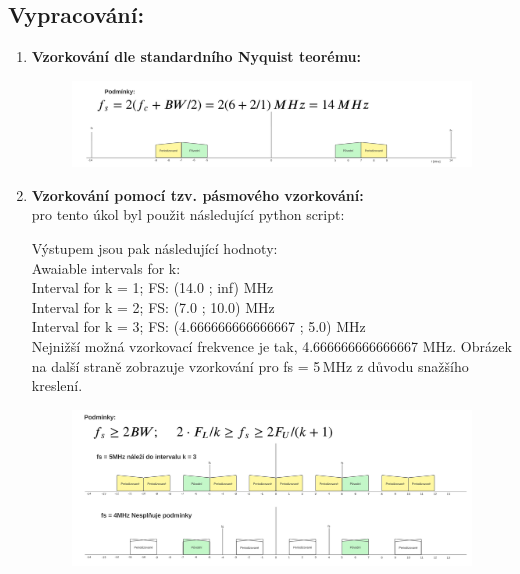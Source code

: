 \documentclass[10pt, a4paper]{article}%
\begin{document}
        \subsection*{Vypracování:}
        \begin{enumerate}

            \item	\textbf{Vzorkování dle standardního Nyquist teorému:}
            \begin{figure}[ht!]
                \centering
                \includegraphics[width = \textwidth]{pict/NQST.png}
            \end{figure}            
            \item	\textbf{Vzorkování pomocí tzv. pásmového vzorkování:}\\
            pro tento úkol byl použit následující python script:
            

            Výstupem jsou pak následující hodnoty:\\
            Awaiable intervals for k:\\
            Interval for k = 1; FS: (14.0 ; inf) MHz\\
            Interval for k = 2; FS: (7.0 ; 10.0) MHz\\
            Interval for k = 3; FS: (4.666666666666667 ; 5.0) MHz\\

            Nejnižší možná vzorkovací frekvence je tak, 4.666666666666667 MHz. Obrázek na další straně
            zobrazuje vzorkování pro fs = 5\,MHz z důvodu snažšího kreslení.

            \begin{figure}[ht!]
                \centering
                \includegraphics[width = \textwidth]{pict/BandPass.png}
            \end{figure}
            \end{enumerate}
\end{document}
